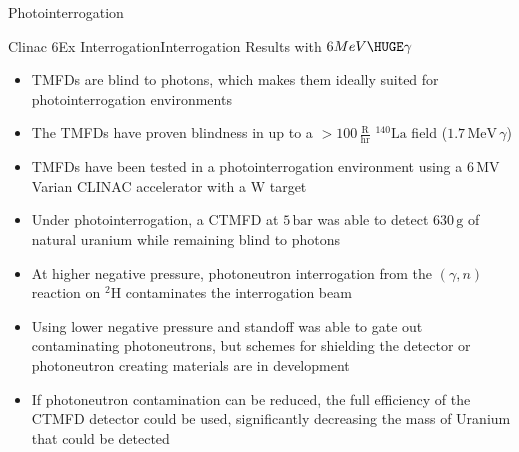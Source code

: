 \begin{pucol}{5}{12}
  \def\numheadings{2}
  \begin{pucell}{5}{8}{Photointerrogation}{}
    \begin{pucol}{2}{8}
      \begin{pucell}{2}{5}{Clinac 6Ex Interrogation}{Interrogation Results with $6 MeV {\HUGE \gamma}$}
        \begin{itemize}
          \item TMFDs are blind to photons, which makes them ideally suited for photointerrogation environments
          \item The TMFDs have proven blindness in up to a $>100\,\mathrm{\frac{R}{hr}}$ $\mathrm{^{140}La}$ field ($1.7\,\mathrm{MeV}\,\gamma$)
          \item TMFDs have been tested in a photointerrogation environment using a $6\,\mathrm{MV}$ Varian CLINAC accelerator with a $\mathrm{W}$ target
          \item Under photointerrogation, a CTMFD at $5\,\mathrm{bar}$ was able to detect $630\,\mathrm{g}$ of natural uranium while remaining blind to photons
          \item At higher negative pressure, photoneutron interrogation from the $\left(\gamma,n\right)$ reaction on $\mathrm{^{2}H}$ contaminates the interrogation beam
          \item Using lower negative pressure and standoff was able to gate out contaminating photoneutrons, but schemes for shielding the detector or photoneutron creating materials are in development
          \item If photoneutron contamination can be reduced, the full efficiency of the CTMFD detector could be used, significantly decreasing the mass of Uranium that could be detected
        \end{itemize}
      \end{pucell} \\
      \vspace*{\fill}
      \begin{pucell}{2}{3}{}{}
      \end{pucell}
    \end{pucol}%
    \begin{pucol}{3}{8}
      \begin{pucell}{3}{3}{}{}

\end{pucell}
\end{pucol}
\end{pucell}
\end{pucol}

